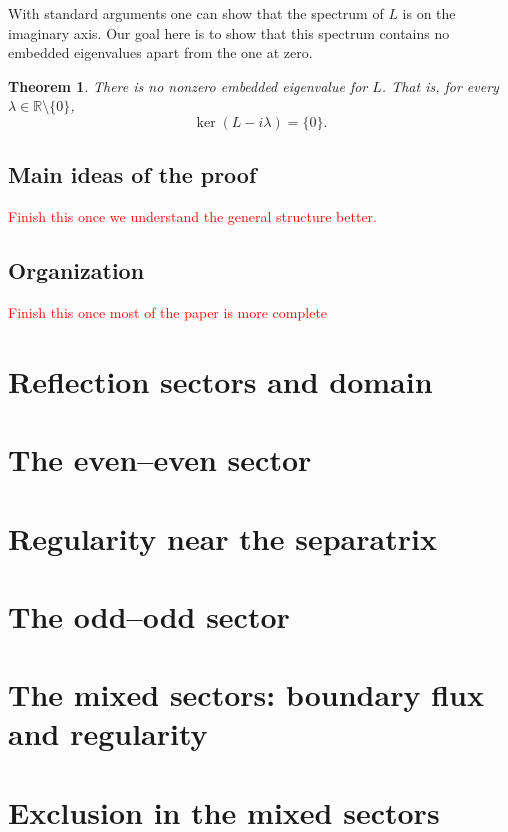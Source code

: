 \documentclass[11pt]{article}
\numberwithin{equation}{section}
\newtheorem{theorem}{Theorem}[section]
\theoremstyle{definition}
\theoremstyle{remark}
\newcommand{\R}{\mathbb R}
\newcommand{\todo}[1]{\textcolor{red}{#1}}
\begin{document}
With standard arguments one can show that the spectrum of \(L\) is on
the imaginary axis. Our goal here is to show that this spectrum
contains no embedded eigenvalues apart from the one at zero.
\begin{theorem}\label{thm:main}
  There is no nonzero embedded eigenvalue for $L$. That is, for every
  $\lambda\in\R\setminus\{0\}$,
  \begin{equation*}
    \ker(L - i\lambda) = \{0\}.
  \end{equation*}
\end{theorem}

\subsection{Main ideas of the proof}
\todo{Finish this once we understand the general structure better.}

\subsection{Organization}
\todo{Finish this once most of the paper is more complete}

\section{Reflection sectors and domain}\label{sec:spectral-foundations}

\section{The even--even sector}\label{sec:ee-exclusion}

\section{Regularity near the separatrix}\label{sec:saddle-gains}

\section{The odd--odd sector}\label{sec:dd-exclusion}

\section{The mixed sectors: boundary flux and regularity}\label{sec:mixed-regularity}

\section{Exclusion in the mixed sectors}\label{sec:mixed-exclusion}
\end{document}
